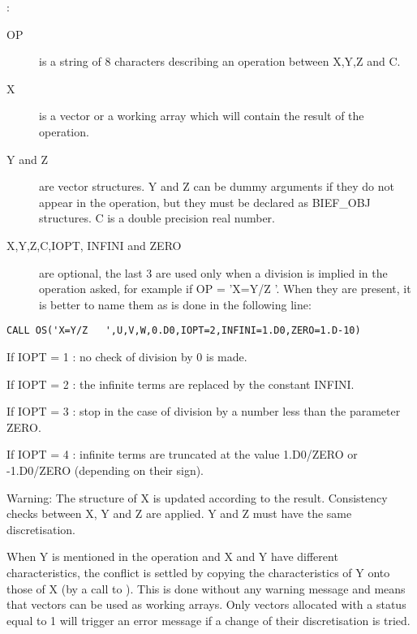 :
\begin{description}
  \item [OP] is a string of 8 characters describing an operation between X,Y,Z
  and C.
  \item [X] is a vector or a working array which will contain the result of the
    operation.
  \item [Y and Z] are vector structures. Y and Z can be dummy arguments if they
    do not appear in the operation, but they must be declared as BIEF\_OBJ
    structures. C is a double precision real number.

  \item [X,Y,Z,C,IOPT, INFINI and ZERO] are optional, the last 3 are used only
    when a division is implied in the operation asked, for example if OP =
    'X=Y/Z   '. When they are present, it is better to name them as is done in
    the following line:
\end{description}

\begin{lstlisting}[language=TelFortran]
CALL OS('X=Y/Z   ',U,V,W,0.D0,IOPT=2,INFINI=1.D0,ZERO=1.D-10)
\end{lstlisting}

If IOPT = 1 : no check of division by 0 is made.

If IOPT = 2 : the infinite terms are replaced by the constant INFINI.

If IOPT = 3 : stop in the case of division by a number less than the parameter
ZERO.

If IOPT = 4 : infinite terms are truncated at the value 1.D0/ZERO or -1.D0/ZERO
(depending on their sign).

\begin{WarningBlock}{Warning:}
The structure of X is updated according to the result. Consistency checks
between X, Y and Z are applied. Y and Z must have the same discretisation.
\end{WarningBlock}


When Y is mentioned in the operation and X and Y have different
characteristics, the conflict is settled by copying the characteristics of Y
onto those of X (by a call to ). This is done without
any warning message and means that vectors can be used as working arrays. Only
vectors allocated with a status equal to 1 will trigger an error message if a
change of their discretisation is tried.

